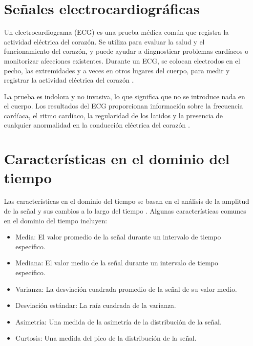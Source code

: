 \section{Señales electrocardiográficas}
Un electrocardiograma (ECG) es una prueba médica común que registra la actividad eléctrica del corazón. Se utiliza para evaluar la salud y el funcionamiento del corazón, y puede ayudar a diagnosticar problemas cardíacos o monitorizar afecciones existentes. Durante un ECG, se colocan electrodos en el pecho, las extremidades y a veces en otros lugares del cuerpo, para medir y registrar la actividad eléctrica del corazón \cite{ecg_def}.

La prueba es indolora y no invasiva, lo que significa que no se introduce nada en el cuerpo. Los resultados del ECG proporcionan información sobre la frecuencia cardíaca, el ritmo cardíaco, la regularidad de los latidos y la presencia de cualquier anormalidad en la conducción eléctrica del corazón \cite{zavala2017descripcion}.


\section{Características en el dominio del tiempo}
Las características en el dominio del tiempo se basan en el análisis de la amplitud de la señal y sus cambios a lo largo del tiempo \cite{carac_time}. Algunas características comunes en el dominio del tiempo incluyen:
\begin{itemize}
    \item Media: 
    El valor promedio de la señal durante un intervalo de tiempo específico.
    \item Mediana: 
    El valor medio de la señal durante un intervalo de tiempo específico.
    \item Varianza: 
    La desviación cuadrada promedio de la señal de su valor medio.
    \item Desviación estándar: 
    La raíz cuadrada de la varianza.
    \item Asimetría: 
    Una medida de la asimetría de la distribución de la señal.
    \item Curtosis: 
    Una medida del pico de la distribución de la señal.
\end{itemize}

